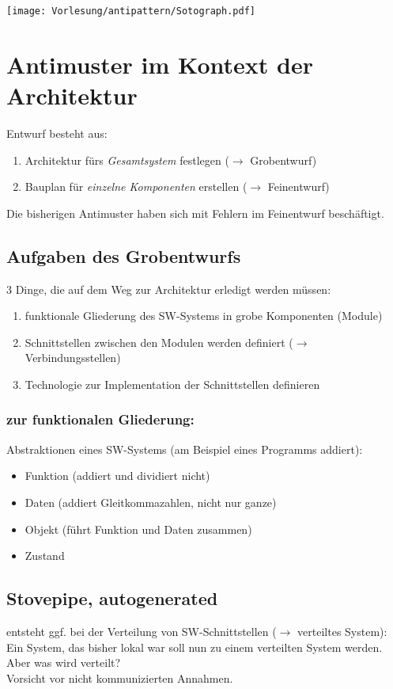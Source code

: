 \begin{center}
\texttt{[image: Vorlesung/antipattern/Sotograph.pdf]}
\end{center}

\section{Antimuster im Kontext der Architektur}
Entwurf besteht aus:
\begin{enumerate}
\item Architektur fürs \emph{Gesamtsystem} festlegen ($\to$ Grobentwurf)
\item Bauplan für \emph{einzelne Komponenten} erstellen ($\to$ Feinentwurf)
\end{enumerate}
Die bisherigen Antimuster haben sich mit Fehlern im Feinentwurf beschäftigt.

\subsection*{Aufgaben des Grobentwurfs}
3 Dinge, die auf dem Weg zur Architektur erledigt werden müssen:
\begin{enumerate}
\item funktionale Gliederung des SW-Systems in grobe Komponenten (Module)
\item Schnittstellen zwischen den Modulen werden definiert ($\to$ Verbindungsstellen)
\item Technologie zur Implementation der Schnittstellen definieren
\end{enumerate}

\subsubsection*{zur funktionalen Gliederung:}
Abstraktionen eines SW-Systems (am Beispiel eines Programms addiert):
\begin{itemize}
\item Funktion (addiert und dividiert nicht)
\item Daten (addiert Gleitkommazahlen, nicht nur ganze)
\item Objekt (führt Funktion und Daten zusammen)
\item Zustand
\end{itemize}

\subsection{Stovepipe, autogenerated}
entsteht ggf. bei der Verteilung von SW-Schnittstellen ($\to$ verteiltes System): Ein System, das bisher lokal war soll nun zu einem verteilten System werden. Aber was wird verteilt?\\
Vorsicht vor nicht kommunizierten Annahmen.

